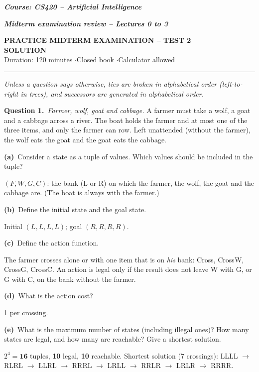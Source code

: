 \documentclass[11pt,a4paper]{article}
\newcommand{\question}[1]{\par\medskip\noindent\textbf{Question #1.}\ }
\newcommand{\subq}[1]{\par\smallskip\noindent\textbf{#1}\ }
\begin{document}
{\large\textbf{\textit{Course: CS420 -- Artificial Intelligence}}}\par
{\textbf{\textit{Midterm examination review -- Lectures 0 to 3}}}\par
\begin{center}{\Large\bfseries PRACTICE MIDTERM EXAMINATION -- TEST 2\\[2pt]\textcolor{blue!55!black}{SOLUTION}}\\[3pt]
{\small Duration: 120 minutes \quad$\cdot$\quad Closed book \quad$\cdot$\quad Calculator allowed}\end{center}
\noindent\rule{\linewidth}{0.6pt}

{\small\textit{Unless a question says otherwise, ties are broken in alphabetical order (left-to-right in trees), and successors are generated in alphabetical order.}}\par
\question{1}\textit{Farmer, wolf, goat and cabbage.} A farmer must take a wolf, a goat and a cabbage across a river. The boat holds the farmer and at most one of the three items, and only the farmer can row. Left unattended (without the farmer), the wolf eats the goat and the goat eats the cabbage.
\subq{(a)}Consider a state as a tuple of values. Which values should be included in the tuple?
\begin{solbox}
$(F, W, G, C)$: the bank (L or R) on which the farmer, the wolf, the goat and the cabbage are. (The boat is always with the farmer.)
\end{solbox}
\subq{(b)}Define the initial state and the goal state.
\begin{solbox}
Initial $(L,L,L,L)$; goal $(R,R,R,R)$.
\end{solbox}
\subq{(c)}Define the action function.
\begin{solbox}
The farmer crosses alone or with one item that is on \emph{his} bank: Cross, CrossW, CrossG, CrossC. An action is legal only if the result does not leave W with G, or G with C, on the bank without the farmer.
\end{solbox}
\subq{(d)}What is the action cost?
\begin{solbox}
1 per crossing.
\end{solbox}
\subq{(e)}What is the maximum number of states (including illegal ones)? How many states are legal, and how many are reachable? Give a shortest solution.
\begin{solbox}
$2^4=\mathbf{16}$ tuples, \textbf{10} legal, \textbf{10} reachable. Shortest solution (7 crossings): LLLL $\to$ RLRL $\to$ LLRL $\to$ RRRL $\to$ LRLL $\to$ RRLR $\to$ LRLR $\to$ RRRR.
\end{solbox}
\end{document}
